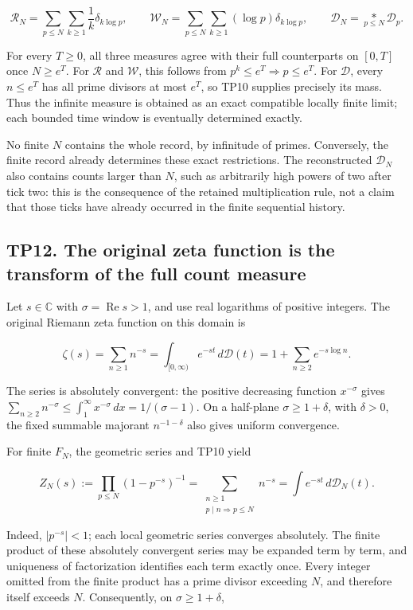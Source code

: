 \documentclass[
]{article}
\begin{document}
\[
\mathcal R_N=\sum_{p\le N}\sum_{k\ge1}\frac1k\delta_{k\log p},
\qquad
\mathcal W_N=\sum_{p\le N}\sum_{k\ge1}(\log p)\delta_{k\log p},
\qquad
\mathcal D_N=\underset{p\le N}{*}\mathcal D_p.
\]

For every \(T\ge0\), all three measures agree with their full
counterparts on \([0,T]\) once \(N\ge e^T\). For \(\mathcal R\) and
\(\mathcal W\), this follows from \(p^k\le e^T\Rightarrow p\le e^T\).
For \(\mathcal D\), every \(n\le e^T\) has all prime divisors at most
\(e^T\), so TP10 supplies precisely its mass. Thus the infinite measure
is obtained as an exact compatible locally finite limit; each bounded
time window is eventually determined exactly.

No finite \(N\) contains the whole record, by infinitude of primes.
Conversely, the finite record already determines these exact
restrictions. The reconstructed \(\mathcal D_N\) also contains counts
larger than \(N\), such as arbitrarily high powers of two after tick
two: this is the consequence of the retained multiplication rule, not a
claim that those ticks have already occurred in the finite sequential
history.

\subsection{TP12. The original zeta function is the transform of the
full count
measure}\label{tp12.-the-original-zeta-function-is-the-transform-of-the-full-count-measure}

Let \(s\in\mathbb C\) with \(\sigma=\operatorname{Re}s>1\), and use real
logarithms of positive integers. The original Riemann zeta function on
this domain is

\[
\zeta(s)=\sum_{n\ge1}n^{-s}
=\int_{[0,\infty)}e^{-st}\,d\mathcal D(t)
=1+\sum_{n\ge2}e^{-s\log n}.
\]

The series is absolutely convergent: the positive decreasing function
\(x^{-\sigma}\) gives
\(\sum_{n\ge2}n^{-\sigma}\le\int_1^\infty x^{-\sigma}\,dx=1/(\sigma-1)\).
On a half-plane \(\sigma\ge1+\delta\), with \(\delta>0\), the fixed
summable majorant \(n^{-1-\delta}\) also gives uniform convergence.

For finite \(F_N\), the geometric series and TP10 yield

\[
Z_N(s):=\prod_{p\le N}(1-p^{-s})^{-1}
=\sum_{\substack{n\ge1\\p\mid n\Rightarrow p\le N}}n^{-s}
=\int e^{-st}\,d\mathcal D_N(t).
\]

Indeed, \(|p^{-s}|<1\); each local geometric series converges
absolutely. The finite product of these absolutely convergent series may
be expanded term by term, and uniqueness of factorization identifies
each term exactly once. Every integer omitted from the finite product
has a prime divisor exceeding \(N\), and therefore itself exceeds \(N\).
Consequently, on \(\sigma\ge1+\delta\),
\end{document}
